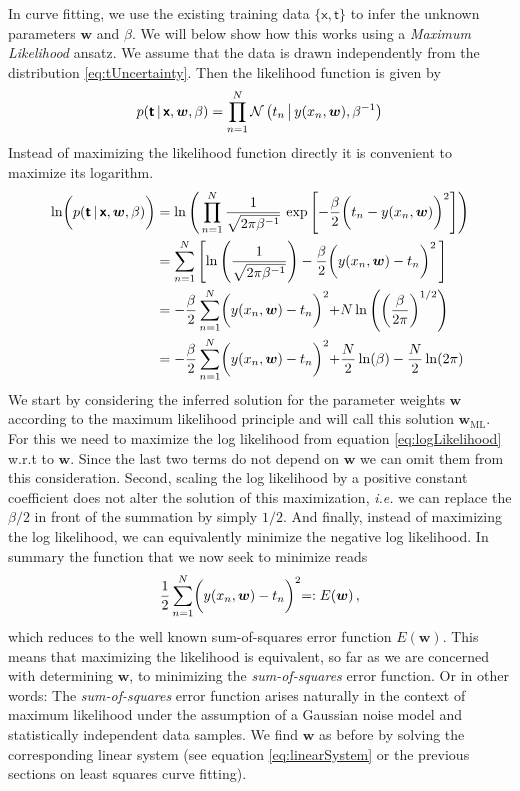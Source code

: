 \documentclass[11pt,DINA4, fleqn]{amsart}
\begin{document}
In curve fitting, we use the existing training data $\{\boldsymbol{\mathsf{x}}, \boldsymbol{\mathsf{t}}\}$ to infer the unknown parameters $\bm{w}$ and $\beta$.
We will below show how this works using a \emph{Maximum Likelihood} ansatz.
We assume that the data is drawn independently from the distribution \eqref{eq:tUncertainty}. Then the likelihood function is given by
\begin{align}
p(\boldsymbol{\mathsf{t}} \, | \, \boldsymbol{\mathsf{x}}, \bm{w}, \beta) = 
\prod\displaylimits_{n = 1}^{N}
\mathcal{N}\left(
t_n \, \bigl| \, y(x_n,\bm{w}), \beta^{-1}\right)
\label{eq:likelihoodFunc}
\end{align}
Instead of maximizing the likelihood function directly it is convenient to maximize its logarithm.
\begin{align}
\ln\biggl(p(\boldsymbol{\mathsf{t}} \, | \, \boldsymbol{\mathsf{x}}, \bm{w}, \beta)\biggl) &= \ln\left(\,
\prod\displaylimits_{n=1}^{N} \dfrac{1}{\sqrt{2\pi \beta^{-1}}} \, \exp\left[
-\dfrac{\beta}{2}\biggl(t_n - y(x_n,\bm{w})\biggl)^2
\right]
\right) \\
&=
\sum\displaylimits_{n=1}^{N}
\left[
\ln\left(\dfrac{1}{\sqrt{2\pi \beta^{-1}}}\right) -
\dfrac{\beta}{2}\biggl(y(x_n, \bm{w}) - t_n\biggl)^2 \,
\right] \\
&=
-\dfrac{\beta}{2}\sum\displaylimits_{n=1}^{N} \biggl(y(x_n, \bm{w}) - t_n\biggl)^2 +
N \ln\left(\left(\dfrac{\beta}{2\pi}\right)^{1/2}\right) \\
&= 
-\dfrac{\beta}{2}\sum\displaylimits_{n=1}^{N} \biggl(y(x_n, \bm{w}) - t_n\biggl)^2 +
\dfrac{N}{2}\ln(\beta)
- \dfrac{N}{2}\ln(2\pi)
\label{eq:logLikelihood}
\end{align}
We start by considering the inferred solution for the parameter weights $\bm{w}$ according to the maximum likelihood principle and will call this solution $\bm{w}_{\text{ML}}$. For this we need to maximize the log likelihood from equation \eqref{eq:logLikelihood} w.r.t to $\bm{w}$.
Since the last two terms do not depend on $\bm{w}$ we can omit them from this consideration. Second, scaling the log likelihood by a positive constant coefficient does not alter the solution of this maximization, \textit{i.e.} we can replace the $\beta/ 2$ in front of the summation by simply $1/2$. And finally, instead of maximizing the log likelihood, we can equivalently minimize the negative log likelihood. In summary the function that we now seek to minimize reads
\begin{align}
\dfrac{1}{2} \sum\displaylimits_{n=1}^{N} \biggl(y(x_n, \bm{w}) - t_n\biggl)^2 =: E(\bm{w}) \, ,
\end{align}
which reduces to the well known sum-of-squares error function $E(\bm{w})$.
This means that maximizing the likelihood is equivalent, so far as we are concerned with determining $\bm{w}$, to minimizing the \emph{sum-of-squares} error function.
Or in other words: The \emph{sum-of-squares} error function arises naturally in the context of maximum likelihood under the assumption of a Gaussian noise model and statistically independent data samples. We find $\bm{w}$ as before by solving the corresponding linear system (see equation \eqref{eq:linearSystem} or the previous sections on least squares curve fitting).
\end{document}
